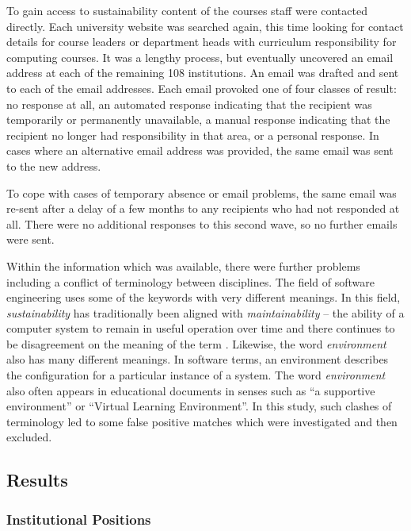 To gain access to sustainability content of the courses staff were contacted directly. Each university website was searched again, this time looking for contact details for course leaders or department heads with curriculum responsibility for computing courses. It was a lengthy process, but eventually uncovered an email address at each of the remaining 108 institutions. An email was drafted and sent to each of the email addresses. Each email provoked one of four classes of result: no response at all, an automated response indicating that the recipient was temporarily or permanently unavailable, a manual response indicating that the recipient no longer had responsibility in that area, or a personal response. In cases where an alternative email address was provided, the same email was sent to the new address. 

To cope with cases of temporary absence or email problems, the same email was re-sent after a delay of a few months to any recipients who had not responded at all. There were no additional responses to this second wave, so no further emails were sent.

Within the information which was available, there were further problems including a conflict of terminology between disciplines. The field of software engineering uses some of the keywords with very different meanings. In this field, \emph{sustainability} has traditionally been aligned with \emph{maintainability} -- the ability of a computer system to remain in useful operation over time \citep{Venters2021} and there continues to be disagreement on the meaning of the term \citep{Venters2014}. Likewise, the word \emph{environment} also has many different meanings. In software terms, an environment describes the configuration for a particular instance of a system. The word \emph{environment} also often appears in educational documents in senses such as \enquote{a supportive environment} or \enquote{Virtual Learning Environment}. In this study, such clashes of terminology led to some false positive matches which were investigated and then excluded.

\subsection*{Results}

\subsubsection*{Institutional Positions}

